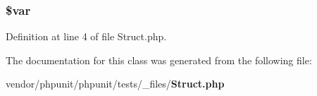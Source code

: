 \subsubsection[{\$var}]{\setlength{\rightskip}{0pt plus 5cm}\$var}\label{class_struct_a9184c9cf1f1e58b87296500a3c3a9291}


Definition at line 4 of file Struct.\+php.



The documentation for this class was generated from the following file\+:\begin{DoxyCompactItemize}
\item 
vendor/phpunit/phpunit/tests/\+\_\+files/{\bf Struct.\+php}\end{DoxyCompactItemize}
